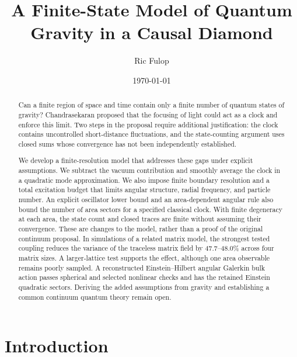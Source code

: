 \documentclass[onecolumn,11pt,aps,prd,amsmath,amssymb,nofootinbib,floatfix]{revtex4-2}
\begin{document}
\title{A Finite-State Model of Quantum Gravity in a Causal Diamond}

\author{Ric Fulop}
\date{\today}

\begin{abstract}
Can a finite region of space and time contain only a finite number of quantum states of gravity? Chandrasekaran proposed that the focusing of light could act as a clock and enforce this limit. Two steps in the proposal require additional justification: the clock contains uncontrolled short-distance fluctuations, and the state-counting argument uses closed sums whose convergence has not been independently established.

We develop a finite-resolution model that addresses these gaps under explicit assumptions. We subtract the vacuum contribution and smoothly average the clock in a quadratic mode approximation. We also impose finite boundary resolution and a total excitation budget that limits angular structure, radial frequency, and particle number. An explicit oscillator lower bound and an area-dependent angular rule also bound the number of area sectors for a specified classical clock. With finite degeneracy at each area, the state count and closed traces are finite without assuming their convergence. These are changes to the model, rather than a proof of the original continuum proposal. In simulations of a related matrix model, the strongest tested coupling reduces the variance of the traceless matrix field by 47.7--48.0\% across four matrix sizes. A larger-lattice test supports the effect, although one area observable remains poorly sampled. A reconstructed Einstein--Hilbert angular Galerkin bulk action passes spherical and selected nonlinear checks and has the retained Einstein quadratic sectors. Deriving the added assumptions from gravity and establishing a common continuum quantum theory remain open.
\end{abstract}

\maketitle

\section{Introduction}\label{sec:intro}
\end{document}
